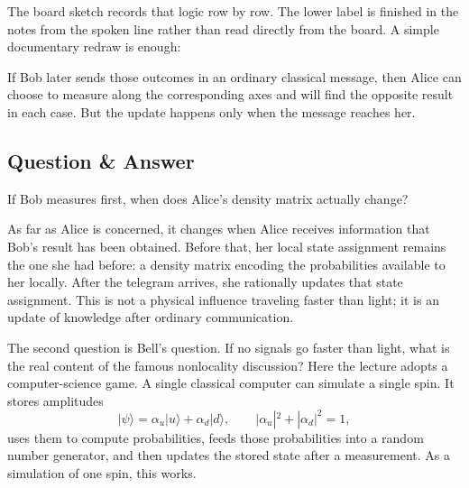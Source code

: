 The board sketch records that logic row by row. The lower label is finished in the notes from the spoken line rather than read directly from the board. A simple documentary redraw is enough:

\begin{figure}[ht]
\centering
{}
\end{figure}

If Bob later sends those outcomes in an ordinary classical message, then Alice can choose to measure along the corresponding axes and will find the opposite result in each case. But the update happens only when the message reaches her.

\subsection{Question \& Answer}

If Bob measures first, when does Alice's density matrix actually change?

As far as Alice is concerned, it changes when Alice receives information that Bob's result has been obtained. Before that, her local state assignment remains the one she had before: a density matrix encoding the probabilities available to her locally. After the telegram arrives, she rationally updates that state assignment. This is not a physical influence traveling faster than light; it is an update of knowledge after ordinary communication.

The second question is Bell's question. If no signals go faster than light, what is the real content of the famous nonlocality discussion? Here the lecture adopts a computer-science game. A single classical computer can simulate a single spin. It stores amplitudes
\begin{equation}
|\psi\rangle=\alpha_u|u\rangle+\alpha_d|d\rangle,
\qquad
|\alpha_u|^2+|\alpha_d|^2=1,
\end{equation}
uses them to compute probabilities, feeds those probabilities into a random number generator, and then updates the stored state after a measurement. As a simulation of one spin, this works.

